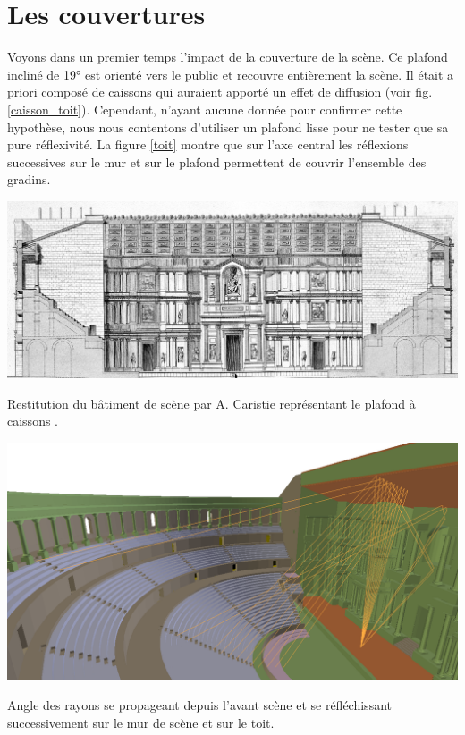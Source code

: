 \section{Les couvertures}
Voyons dans un premier temps l'impact de la couverture de la scène. Ce plafond incliné de 19° est orienté vers le public et recouvre entièrement la scène. Il était a priori composé de caissons qui auraient apporté un effet de diffusion (voir fig. \ref{caisson_toit}). Cependant, n'ayant aucune donnée pour confirmer cette hypothèse, nous nous contentons d'utiliser un plafond lisse pour ne tester que sa pure réflexivité. La figure \ref{toit} montre que sur l'axe central les réflexions successives sur le mur et sur le plafond permettent de couvrir l'ensemble des gradins.
\begin{figureth}
	\includegraphics[width=\linewidth]{images/caisson_toit}
	\caption[Restitution du bâtiment de scène par A. Caristie représentant le plafond à caissons.]{Restitution du bâtiment de scène par A. Caristie représentant le plafond à caissons \footnotemark.}
	\label{caisson_toit}
\end{figureth}
%
\begin{figureth}
	\includegraphics[width=\linewidth]{images/toit}
	\caption{Angle des rayons se propageant depuis l'avant scène et se réfléchissant successivement sur le mur de scène et sur le toit.}
	\label{toit}
\end{figureth}


